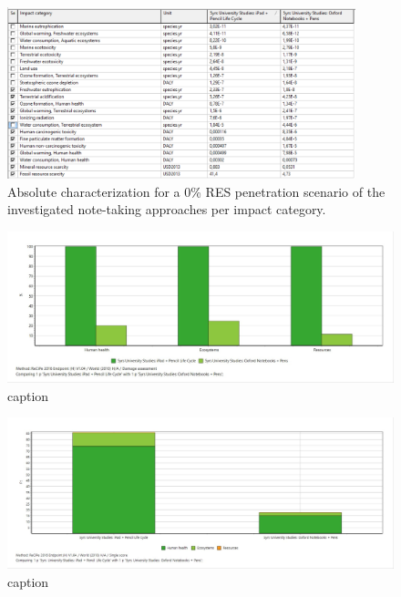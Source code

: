 \begin{figure}[H]
    \centering
    \includegraphics[width=0.9\textwidth]{images/RES_0/Characterization_Table_RES_0.PNG}
    \caption{Absolute characterization for a 0\% RES penetration scenario of the investigated note-taking approaches per impact category.}\label{fig:characterization_table_RES_0}
\end{figure}

\begin{figure}[H]
    \centering
    \includegraphics[width=\textwidth]{images/RES_0/Damage_Assessment_RES_0.JPG}
    \caption{caption}\label{fig:damage_assessment_RES_0}
\end{figure}

\begin{figure}[H]
    \centering
    \includegraphics[width=\textwidth]{images/RES_0/Single_Score_RES_0.JPG}
    \caption{caption}\label{fig:single_score_RES0}
\end{figure}

